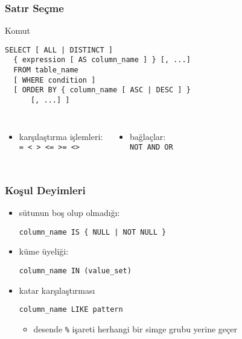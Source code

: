 \documentclass[dvipsnames]{beamer}
\theoremstyle{definition}
\theoremstyle{example}
\theoremstyle{plain}
\begin{document}
\begin{frame}[fragile]
  \frametitle{Satır Seçme}

  \begin{block}{Komut}
    \begin{lstlisting}
SELECT [ ALL | DISTINCT ]
  { expression [ AS column_name ] } [, ...]
  FROM table_name
  [ WHERE condition ]
  [ ORDER BY { column_name [ ASC | DESC ] }
      [, ...] ]
    \end{lstlisting}
  \end{block}

  \pause
  \begin{columns}
    \begin{itemize}
      \item karşılaştırma işlemleri:\\
        \lstinline!= < > <= >= <>!
    \end{itemize}

    \begin{itemize}
      \item bağlaçlar:\\
        \lstinline!NOT AND OR!
    \end{itemize}
  \end{columns}
\end{frame}

\begin{frame}[fragile]
  \frametitle{Koşul Deyimleri}

  \begin{itemize}
    \item sütunun boş olup olmadığı:\\
    \begin{lstlisting}
column_name IS { NULL | NOT NULL }
    \end{lstlisting}

    \pause
    \item küme üyeliği:\\
    \begin{lstlisting}
column_name IN (value_set)
    \end{lstlisting}

    \pause
    \item katar karşılaştırması
    \begin{lstlisting}
column_name LIKE pattern
    \end{lstlisting}
    \begin{itemize}
      \item desende \lstinline!%! işareti herhangi bir simge grubu yerine geçer
    \end{itemize}
  \end{itemize}
\end{frame}
\end{document}
